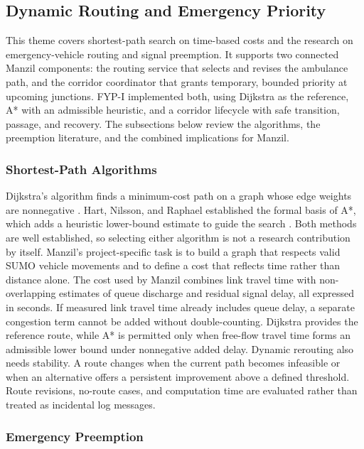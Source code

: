 \subsection{Dynamic Routing and Emergency Priority}

This theme covers shortest-path search on time-based costs and the research on emergency-vehicle routing and signal preemption. It supports two connected Manzil components: the routing service that selects and revises the ambulance path, and the corridor coordinator that grants temporary, bounded priority at upcoming junctions. FYP-I implemented both, using Dijkstra as the reference, A* with an admissible heuristic, and a corridor lifecycle with safe transition, passage, and recovery. The subsections below review the algorithms, the preemption literature, and the combined implications for Manzil.

\subsubsection{Shortest-Path Algorithms}

Dijkstra's algorithm finds a minimum-cost path on a graph whose edge weights are nonnegative \cite{dijkstra1959}. Hart, Nilsson, and Raphael established the formal basis of A*, which adds a heuristic lower-bound estimate to guide the search \cite{hart1968astar}. Both methods are well established, so selecting either algorithm is not a research contribution by itself. Manzil's project-specific task is to build a graph that respects valid SUMO vehicle movements and to define a cost that reflects time rather than distance alone. The cost used by Manzil combines link travel time with non-overlapping estimates of queue discharge and residual signal delay, all expressed in seconds. If measured link travel time already includes queue delay, a separate congestion term cannot be added without double-counting. Dijkstra provides the reference route, while A* is permitted only when free-flow travel time forms an admissible lower bound under nonnegative added delay. Dynamic rerouting also needs stability. A route changes when the current path becomes infeasible or when an alternative offers a persistent improvement above a defined threshold. Route revisions, no-route cases, and computation time are evaluated rather than treated as incidental log messages.

\subsubsection{Emergency Preemption}

